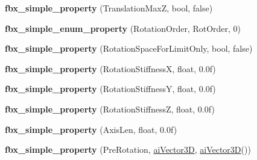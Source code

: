 \begin{DoxyCompactItemize}
\item 
\hypertarget{class_assimp_1_1_f_b_x_1_1_model_a43c1d591ab7b8253c625b3add3302543}{{\bfseries fbx\+\_\+simple\+\_\+property} (Translation\+Max\+Z, bool, false)}\label{class_assimp_1_1_f_b_x_1_1_model_a43c1d591ab7b8253c625b3add3302543}

\item 
\hypertarget{class_assimp_1_1_f_b_x_1_1_model_aaa25285475f9c7e1ef014d8264e8e66c}{{\bfseries fbx\+\_\+simple\+\_\+enum\+\_\+property} (Rotation\+Order, Rot\+Order, 0)}\label{class_assimp_1_1_f_b_x_1_1_model_aaa25285475f9c7e1ef014d8264e8e66c}

\item 
\hypertarget{class_assimp_1_1_f_b_x_1_1_model_a1f11cb6a1ae522111c75bbf03956c0f0}{{\bfseries fbx\+\_\+simple\+\_\+property} (Rotation\+Space\+For\+Limit\+Only, bool, false)}\label{class_assimp_1_1_f_b_x_1_1_model_a1f11cb6a1ae522111c75bbf03956c0f0}

\item 
\hypertarget{class_assimp_1_1_f_b_x_1_1_model_a0e31910be3b396cc70d18d912b86b1d1}{{\bfseries fbx\+\_\+simple\+\_\+property} (Rotation\+Stiffness\+X, float, 0.\+0f)}\label{class_assimp_1_1_f_b_x_1_1_model_a0e31910be3b396cc70d18d912b86b1d1}

\item 
\hypertarget{class_assimp_1_1_f_b_x_1_1_model_a68329884bb025aa7a995cbfffeb6bb01}{{\bfseries fbx\+\_\+simple\+\_\+property} (Rotation\+Stiffness\+Y, float, 0.\+0f)}\label{class_assimp_1_1_f_b_x_1_1_model_a68329884bb025aa7a995cbfffeb6bb01}

\item 
\hypertarget{class_assimp_1_1_f_b_x_1_1_model_aa0402149ad3bca7d34ffb39c6e249b52}{{\bfseries fbx\+\_\+simple\+\_\+property} (Rotation\+Stiffness\+Z, float, 0.\+0f)}\label{class_assimp_1_1_f_b_x_1_1_model_aa0402149ad3bca7d34ffb39c6e249b52}

\item 
\hypertarget{class_assimp_1_1_f_b_x_1_1_model_adf37ccf7b6bb2dea23d7d8ae47fd6f37}{{\bfseries fbx\+\_\+simple\+\_\+property} (Axis\+Len, float, 0.\+0f)}\label{class_assimp_1_1_f_b_x_1_1_model_adf37ccf7b6bb2dea23d7d8ae47fd6f37}

\item 
\hypertarget{class_assimp_1_1_f_b_x_1_1_model_ae1cbc25e587f8a73f4c30401b480ef7d}{{\bfseries fbx\+\_\+simple\+\_\+property} (Pre\+Rotation, \hyperlink{structai_vector3_d}{ai\+Vector3\+D}, \hyperlink{structai_vector3_d}{ai\+Vector3\+D}())}\label{class_assimp_1_1_f_b_x_1_1_model_ae1cbc25e587f8a73f4c30401b480ef7d}


\end{DoxyCompactItemize}
